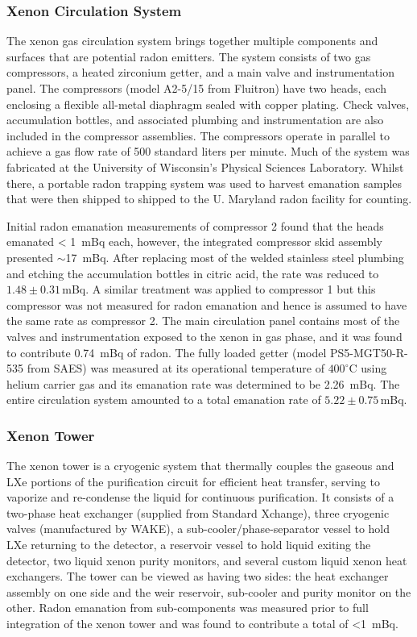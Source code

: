 \subsubsection{Xenon Circulation System}

The xenon gas circulation system brings together multiple components and surfaces that are potential radon emitters. The system consists of two gas compressors, a heated zirconium getter, and a main valve and instrumentation panel. The compressors (model A2-5/15 from Fluitron) have two heads, each enclosing a flexible all-metal diaphragm sealed with copper plating. Check valves, accumulation bottles, and associated plumbing and instrumentation are also included in the compressor assemblies. The compressors operate in parallel to achieve a gas flow rate of 500 standard liters per minute. Much of the system was fabricated at the University of Wisconsin's Physical Sciences Laboratory. Whilst there, a portable radon trapping system was used to harvest emanation samples that were then shipped to shipped to the U. Maryland radon facility for counting.

Initial radon emanation measurements of compressor 2 found that the heads emanated \SI{< 1}{\milli\becquerel} each, however, the integrated compressor skid assembly presented $\sim$\SI{17}{\milli\becquerel}. After replacing most of the welded stainless steel plumbing and etching the accumulation bottles in citric acid, the rate was reduced to $1.48\pm0.31$\,mBq. A similar treatment was applied to compressor 1 but this compressor was not measured for radon emanation and hence is assumed to have the same rate as compressor 2. The main circulation panel contains most of the valves and instrumentation exposed to the xenon in gas phase, and it was found to contribute \SI{0.74}{\milli\becquerel} of radon. The fully loaded getter (model PS5-MGT50-R-535 from SAES) was measured at its operational temperature of $400 ^{\circ}$C using helium carrier gas and its emanation rate was determined to be \SI{2.26}{\milli\becquerel}. The entire circulation system amounted to a total emanation rate of $5.22\pm0.75$\,mBq.


\subsubsection{Xenon Tower}

The xenon tower is a cryogenic system that thermally couples the gaseous and LXe portions of the purification circuit for efficient heat transfer, serving to vaporize and re-condense the liquid for continuous purification. It consists of a two-phase heat exchanger (supplied from Standard Xchange), three cryogenic valves (manufactured by WAKE), a sub-cooler/phase-separator vessel to hold LXe returning to the detector, a reservoir vessel to hold liquid exiting the detector, two liquid xenon purity monitors, and several custom liquid xenon heat exchangers. The tower can be viewed as having two sides: the heat exchanger assembly on one side and the weir reservoir, sub-cooler and purity monitor on the other. Radon emanation from sub-components was measured prior to full integration of the xenon tower and was found to contribute a total of \SI{<1}{\milli\becquerel}. 

